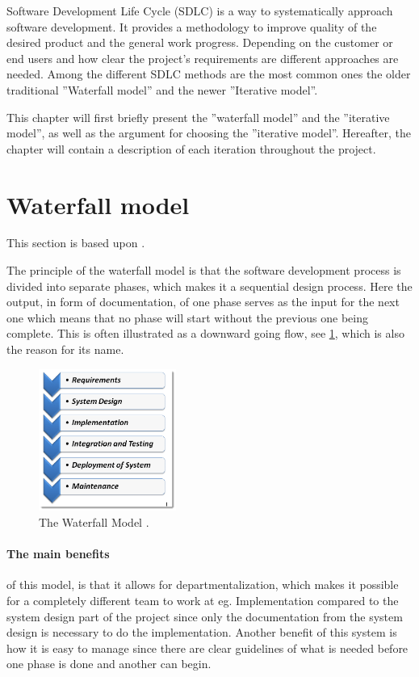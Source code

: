 Software Development Life Cycle (SDLC) is a way to systematically approach software development.
It provides a methodology to improve quality of the desired product and the general work progress. 
Depending on the customer or end users and how clear the project's requirements are different approaches are needed. 
Among the different SDLC methods are the most common ones the older traditional ''Waterfall model'' and the newer ''Iterative model''. \cite{SDLC-Toolsqa}


This chapter will first briefly present the ''waterfall model'' and the ''iterative model'', as well as the argument for choosing the ''iterative model''.
Hereafter, the chapter will contain a description of each iteration throughout the project.


\section{Waterfall model}
This section is based upon \cite{Waterfall-Toolsqa}.

The principle of the waterfall model is that the software development process is divided into separate phases, which makes it a sequential design process.
Here the output, in form of documentation, of one phase serves as the input for the next one which means that no phase will start without the previous one being complete.
This is often illustrated as a downward going flow, see \cref{fig:Waterfall}, which is also the reason for its name.

\begin{figure}[H]
	\centering
	\includegraphics[width=0.4\textwidth]{billeder/WaterFall-Model.png}
	\caption{The Waterfall Model \cite{Waterfall-Toolsqa}.}\label{fig:Waterfall}
\end{figure}

\paragraph{The main benefits} of this model, is that it allows for departmentalization, which makes it possible for a completely different team to work at eg. Implementation compared to the system design part of the project since only the documentation from the system design is necessary to do the implementation.
Another benefit of this system is how it is easy to manage since there are clear guidelines of what is needed before one phase is done and another can begin.

